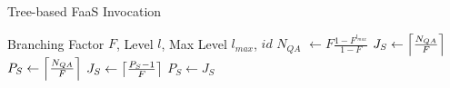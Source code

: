 \renewcommand{\algorithmicrequire}{\textbf{Input:}}

\begin{algorithm}[h]
\begin{algorithmic}[1]

\caption{Tree-based FaaS Invocation}
\label{alg:squash-lambda-launch}

\Require Branching Factor $F$, Level $l$, Max Level $l_{max}$, $id$
\State $N_{QA}$ $\gets F \frac{1 - F^{l_{max}}}{1 - F}$
 
    \State $J_S \gets \ceil*{\frac{N_{QA}}{F}}$ %
        \State {}  %
    \EndFor
{} 
    \State $P_{S} \gets \ceil*{\frac{N_{QA}}{F}}$ 
     
        \State  $J_S \gets \ceil*{\frac{P_{S} - 1}{F}}$
        \State $P_{S} \gets J_S$
    \EndFor
        \State {}  %
    \EndFor
\EndIf


\end{algorithmic}
\end{algorithm}
